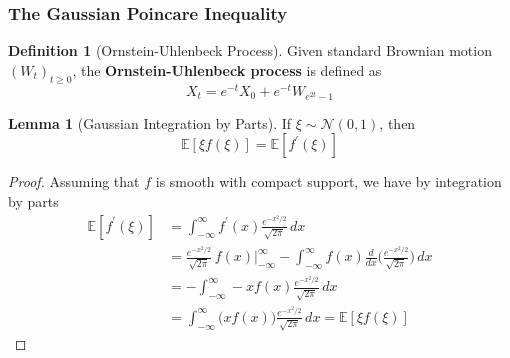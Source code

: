\documentclass{article}
\theoremstyle{definition}
\newtheorem{lemma}[theorem]{Lemma}
\theoremstyle{remark}
\theoremstyle{definition}
\newtheorem{definition}{Definition}[section]
\begin{document}
  \subsubsection{The Gaussian Poincare Inequality}

  \begin{definition}[Ornstein-Uhlenbeck Process]
  Given standard Brownian motion $(W_t)_{t \geq 0}$, the \textbf{Ornstein-Uhlenbeck process} is defined as 
  \[X_t = e^{-t} X_0 + e^{-t} W_{e^{2t} - 1}\]
  \end{definition}

  \begin{lemma}[Gaussian Integration by Parts]
  If $\xi \sim \mathcal{N}(0, 1)$, then 
  \[\mathbb{E}[ \xi f(\xi)] = \mathbb{E}[f^\prime (\xi)]\]
  \end{lemma}
  \begin{proof}
  Assuming that $f$ is smooth with compact support, we have by integration by parts 
  \begin{align*}
      \mathbb{E}[f^\prime (\xi)] & = \int_{-\infty}^\infty f^\prime(x) \frac{e^{-x^2 / 2}}{\sqrt{2\pi}} \,dx \\ 
      & = \frac{e^{-x^2 / 2}}{\sqrt{2\pi}} \, f(x) \bigg|_{-\infty}^\infty - \int_{-\infty}^\infty f(x) \frac{d}{dx} \bigg(\frac{e^{-x^2 / 2}}{\sqrt{2\pi}}\bigg) \,dx \\
      & = - \int_{-\infty}^\infty -x f(x) \frac{e^{-x^2 / 2}}{\sqrt{2\pi}} \,dx \\
      & = \int_{-\infty}^\infty \big( x f(x)\big) \frac{e^{-x^2 / 2}}{\sqrt{2\pi}}\,dx = \mathbb{E}[\xi f(\xi)]
  \end{align*}
  \end{proof}
\end{document}
